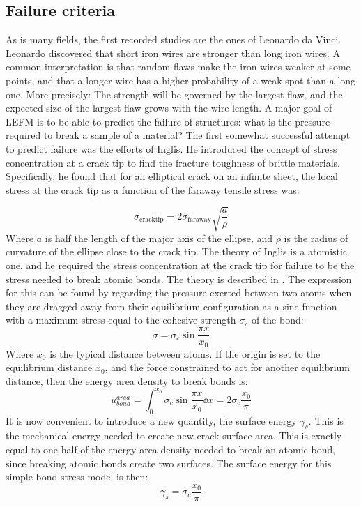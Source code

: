 \subsection{Failure criteria}
As is many fields, the first recorded studies are the ones of Leonardo da Vinci. Leonardo discovered that short iron wires are stronger than long iron wires. A common interpretation is that random flaws make the iron wires weaker at some points, and that a longer wire has a higher probability of a weak spot than a long one. More precisely: The strength will be governed by the largest flaw, and the expected size of the largest flaw grows with the wire length. A major goal of LEFM is to be able to predict the failure of structures: what is the pressure required to break a sample of a material? The first somewhat successful attempt to predict failure was the efforts of Inglis. He introduced the concept of stress concentration at a crack tip to find the fracture toughness of brittle materials. Specifically, he found that for an elliptical crack on an infinite sheet, the local stress at the crack tip as a function of the faraway tensile stress was:

\begin{equation}
	\sigma_{\text{cracktip}} = 2\sigma_{\text{faraway}}\sqrt{\frac{a}{\rho}}
	\label{eq:stress_consentration}
\end{equation}
Where $a$ is half the length of the major axis of the ellipse, and $\rho$ is the radius of curvature of the ellipse close to the crack tip. The theory of Inglis is a atomistic one, and he required the stress concentration at the crack tip for failure to be the stress needed to break atomic bonds. The theory is described in \citet[p.27]{Anderson2005}. The expression for this can be found by regarding the pressure exerted between two atoms when they are dragged away from their equilibrium configuration as a sine function with a maximum stress equal to the cohesive strength $\sigma_c$ of the bond:
\begin{equation}
	\sigma = \sigma_c \sin{\frac{\pi x}{x_0}}
	\label{eq:atomic_force}
\end{equation}
Where $x_0$ is the typical distance between atoms. If the origin is set to the equilibrium distance $x_0$, and the force constrained to act for another equilibrium distance, then the energy area density to break bonds is:
\begin{equation}
u_{bond}^{area} = \int_0^{x_0} \sigma_c \sin{\frac{\pi x}{x_0}} \dd x = 2\sigma_c \frac{x_0}{\pi}
\end{equation}
It is now convenient to introduce a new quantity, the surface energy $\gamma_s$. This is the mechanical energy needed to create new crack surface area. This is exactly equal to one half of the energy area density needed to break an atomic bond, since breaking atomic bonds create two surfaces. The surface energy for this simple bond stress model is then:
\begin{equation}
	\gamma_s = \sigma_c \frac{x_0}{\pi}
	\label{eq:surface_energy}
\end{equation}

